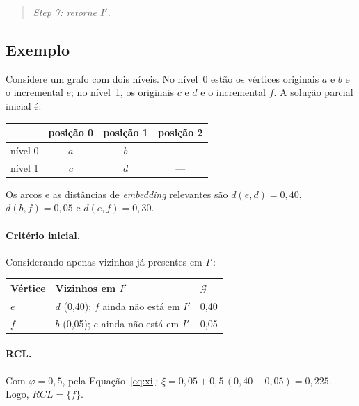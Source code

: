 \documentclass[12pt,a4paper]{article}
\newenvironment{artigo}
  {\begin{quote}\small\itshape}
  {\end{quote}}
\begin{document}
\begin{artigo}
Step 7: retorne $I'$.
\end{artigo}

\subsection{Exemplo}

Considere um grafo com dois níveis. No nível~0 estão os vértices
originais $a$ e $b$ e o incremental $e$; no nível~1, os originais $c$ e
$d$ e o incremental $f$. A solução parcial inicial é:

\begin{center}
\begin{tabular}{lccc}
\toprule
 & posição 0 & posição 1 & posição 2 \\
\midrule
nível 0 & $a$ & $b$ & --- \\
nível 1 & $c$ & $d$ & --- \\
\bottomrule
\end{tabular}
\end{center}

Os arcos e as distâncias de \textit{embedding} relevantes são
$d(e,d) = 0{,}40$, $d(b,f) = 0{,}05$ e $d(e,f) = 0{,}30$.

\paragraph{Critério inicial.} Considerando apenas vizinhos já presentes
em $I'$:

\begin{center}
\begin{tabular}{lll}
\toprule
Vértice & Vizinhos em $I'$ & $\mathcal{G}$ \\
\midrule
$e$ & $d$ (0,40); $f$ ainda não está em $I'$ & 0,40 \\
$f$ & $b$ (0,05); $e$ ainda não está em $I'$ & 0,05 \\
\bottomrule
\end{tabular}
\end{center}

\paragraph{RCL.} Com $\varphi = 0{,}5$, pela
Equação~\eqref{eq:xi}:
$\xi = 0{,}05 + 0{,}5\,(0{,}40 - 0{,}05) = 0{,}225$.
Logo, $RCL = \{f\}$.
\end{document}
